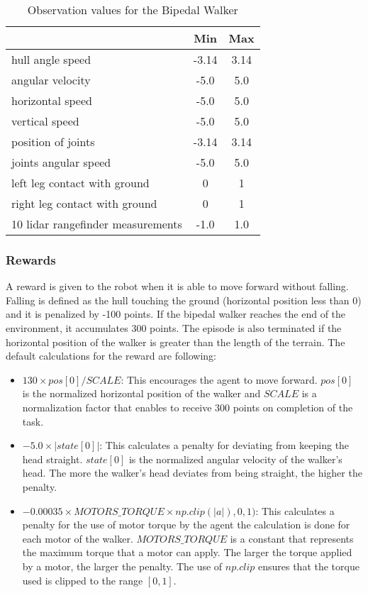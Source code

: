 \begin{table}[!ht]
\centering
\caption{Observation values for the Bipedal Walker}
\begin{tabular}{lcc}
\toprule
& Min & Max \\
\midrule
hull angle speed                    & -3.14 & 3.14 \\
angular velocity                    & -5.0  & 5.0  \\
horizontal speed                    & -5.0  & 5.0  \\
vertical speed                      & -5.0  & 5.0  \\
position of joints                  & -3.14 & 3.14 \\
joints angular speed                & -5.0  & 5.0  \\
left leg contact with ground        & 0     & 1    \\
right leg contact with ground       & 0     & 1    \\
10 lidar rangefinder measurements   & -1.0  & 1.0  \\
\bottomrule

\end{tabular}
\end{table}%

\subsubsection{Rewards}
A reward is given to the robot when it is able to move forward without falling. Falling is defined as the hull touching the ground (horizontal position less than 0) and it is penalized by -100 points. If the bipedal walker reaches the end of the environment, it accumulates 300 points. The episode is also terminated if the horizontal position of the walker is greater than the length of the terrain. The default calculations for the reward are following:

\begin{itemize}
  \item $ 130 \times pos[0] / SCALE$: This encourages the agent to move forward. $pos[0]$ is the normalized horizontal position of the walker and $SCALE$ is a normalization factor that enables to receive 300 points on completion of the task.

  \item $-5.0 \times \lvert state[0] \rvert$: This calculates a penalty for deviating from keeping the head straight. $state[0]$ is the normalized angular velocity of the walker's head. The more the walker's head deviates from being straight, the higher the penalty.

  \item $-0.00035 \times MOTORS\_TORQUE \times np.clip(\lvert a \rvert), 0, 1)$: This calculates a penalty for the use of motor torque by the agent the calculation is done for each motor of the walker. $MOTORS\_TORQUE$ is a constant that represents the maximum torque that a motor can apply. The larger the torque applied by a motor, the larger the penalty. The use of $np.clip$ ensures that the torque used is clipped to the range $[0, 1]$.

\end{itemize}

